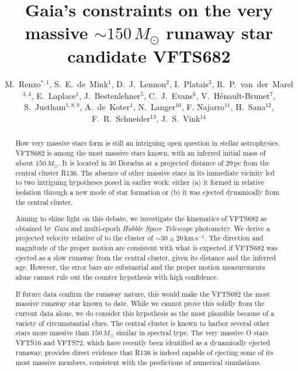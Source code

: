 \documentclass[apjl,twocolumn]{emulateapj}
\newcommand{\kms}{{\,\mathrm{km\ s^{-1}}}}
\begin{document}
\title{Gaia's constraints on the very massive $\sim$$150\,M_\odot$ runaway star candidate VFTS682}

\author{M.~Renzo$^{*,1}$, S.~E.~de~Mink$^{1}$, D.~J.~Lennon$^{2}$, I.~Platais$^{3}$,
  R.~P.~van~der~Marel$^{3,4}$, E.~Laplace$^{1}$,
  J.~Bestenlehner$^{5}$, C.~J.~Evans$^{6}$,
  V.~H\'enault-Brunet$^{7}$,  S.~Justham$^{1,8,9}$,  A.~de~Koter$^{1}$,
  N.~Langer$^{10}$, F. Najarro$^{11}$, H.~Sana$^{12}$, F.~R.~Schneider$^{13}$, J.~S.~Vink$^{14}$}

\begin{abstract}
 
 How very massive stars form is still an intriguing open question in stellar astrophysics.  VFTS682 is among the most massive stars known, with an inferred initial mass of about  $150\,M_\odot$. It is located in 30 Doradus at a projected distance of 29\,pc from the central cluster R136.  The absence of other massive stars in its immediate vicinity led to two intriguing hypotheses posed in earlier work: either (a) it formed in relative isolation through a new mode of star formation or (b) it was ejected dynamically from the central cluster. 
 
Aiming to shine light on this debate, we investigate the kinematics of
VFTS682 as obtained by \emph{Gaia} and multi-epoch \emph{Hubble Space
  Telescope} photometry. We derive a projected velocity relative of to
the cluster of $\sim$$30\pm20\kms$.  The direction and magnitude of
the proper motion are consistent with what is expected if VFTS682 was ejected as a slow runaway from the central cluster, given its distance and the inferred age.  However, the error bars are substantial and the proper motion measurements alone cannot rule out the counter hypothesis with high confidence.   
 
If future data confirm the runaway nature, this would make the VFTS682
the most massive runaway star known to date.  While we cannot prove
this solidly from the current data alone, we do consider this
hypothesis as the most plausible because of a variety of
circumstantial clues. The central cluster is known to harbor several
other stars more massive than $150\,M_\odot$ similar in spectral type.
The very massive O stars VFTS16 and VFTS72, which have recently been identified as a dynamically ejected runaway, provides direct evidence that R136 is indeed capable of ejecting some of its most massive members, consistent with the predictions of numerical simulations.
\end{abstract}
\end{document}
